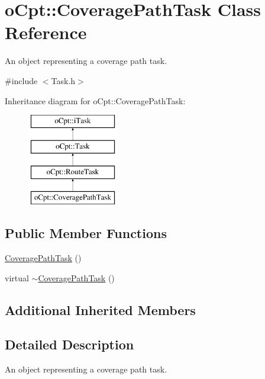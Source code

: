 \hypertarget{classo_cpt_1_1_coverage_path_task}{}\section{o\+Cpt\+:\+:Coverage\+Path\+Task Class Reference}
\label{classo_cpt_1_1_coverage_path_task}


An object representing a coverage path task.  




{\ttfamily \#include $<$Task.\+h$>$}

Inheritance diagram for o\+Cpt\+:\+:Coverage\+Path\+Task\+:\begin{figure}[H]
\begin{center}
\leavevmode
\includegraphics[height=4.000000cm]{classo_cpt_1_1_coverage_path_task}
\end{center}
\end{figure}
\subsection*{Public Member Functions}
\begin{DoxyCompactItemize}
\item 
\hyperlink{classo_cpt_1_1_coverage_path_task_abfdaef848200d9ad4173692cde984ca8}{Coverage\+Path\+Task} ()
\item 
virtual \hyperlink{classo_cpt_1_1_coverage_path_task_a8773343bb232c3a22b8ec6acf483bee1}{$\sim$\+Coverage\+Path\+Task} ()
\end{DoxyCompactItemize}
\subsection*{Additional Inherited Members}


\subsection{Detailed Description}
An object representing a coverage path task. 

